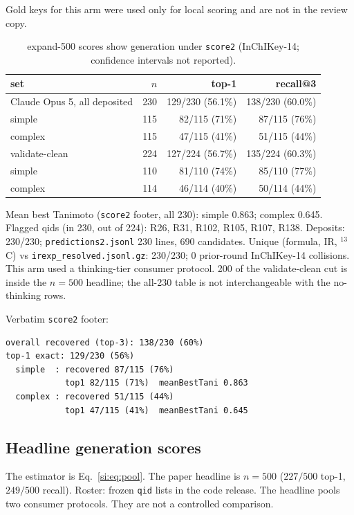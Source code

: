 Gold keys for this arm were used only for local scoring and are not
in the review copy.

\begin{table}[ht]
\caption{expand-500 scores show generation under \texttt{score2}
(InChIKey-14; confidence intervals not reported).}
\centering
\begin{tabular}{@{}lrrr@{}}
\toprule
set & $n$ & top-1 & recall@3 \\
\midrule
Claude Opus 5, all deposited & 230 & 129/230 (56.1\%) & 138/230 (60.0\%) \\
\quad simple & 115 & 82/115 (71\%) & 87/115 (76\%) \\
\quad complex & 115 & 47/115 (41\%) & 51/115 (44\%) \\
validate-clean & 224 & 127/224 (56.7\%) & 135/224 (60.3\%) \\
\quad simple & 110 & 81/110 (74\%) & 85/110 (77\%) \\
\quad complex & 114 & 46/114 (40\%) & 50/114 (44\%) \\
\bottomrule
\end{tabular}
\end{table}

Mean best Tanimoto (\texttt{score2} footer, all 230): simple 0.863; complex 0.645.
Flagged qids (in 230, out of 224): R26, R31, R102, R105, R107, R138.
Deposits: 230/230; \texttt{predictions2.jsonl} 230 lines, 690 candidates.
Unique (formula, IR, $^{13}$C) vs \texttt{irexp\_resolved.jsonl.gz}: 230/230;
0 prior-round InChIKey-14 collisions.
This arm used a thinking-tier consumer protocol.
200 of the validate-clean cut is inside the $n{=}500$ headline;
the all-230 table is not interchangeable with the no-thinking rows.

Verbatim \texttt{score2} footer:
\begin{verbatim}
overall recovered (top-3): 138/230 (60%)
top-1 exact: 129/230 (56%)
  simple  : recovered 87/115 (76%)
            top1 82/115 (71%)  meanBestTani 0.863
  complex : recovered 51/115 (44%)
            top1 47/115 (41%)  meanBestTani 0.645
\end{verbatim}

\subsection{Headline generation scores}
\label{si:pools}

The estimator is Eq.~\ref{si:eq:pool}. The paper headline is $n{=}500$
($227/500$ top-1, $249/500$ recall).
Roster: frozen \texttt{qid} lists in the code release.
The headline pools two consumer protocols.
They are not a controlled comparison.

